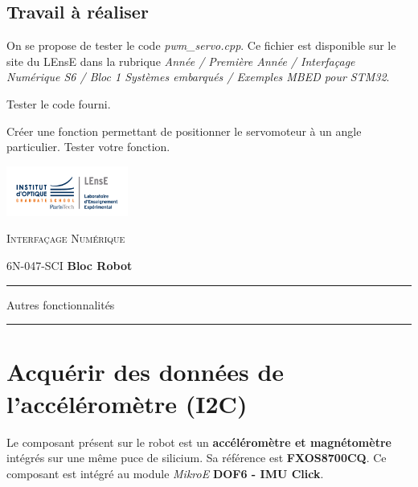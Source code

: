 \documentclass[a4paper,11pt,titlepage]{article} %
\begin{document}
\subsection{Travail à réaliser}

On se propose de tester le code \textsl{pwm\_servo.cpp}. Ce fichier est disponible sur le site du LEnsE dans la rubrique \textit{Année / Première Année / Interfaçage Numérique S6 / Bloc 1 Systèmes embarqués / Exemples MBED pour STM32}.

\Manip Tester le code fourni. 

\Manip Créer une fonction permettant de positionner le servomoteur à un angle particulier. Tester votre fonction. 



\newpage
\strut %
\begin{minipage}[c]{.25\linewidth}
	\includegraphics[width=4cm]{images/Logo-LEnsE.png}
\end{minipage} \hfill
\begin{minipage}[c]{.4\linewidth}

\begin{center}
\vspace{0.3cm}
{\Large \textsc{Interfaçage Numérique}}

\medskip

6N-047-SCI \qquad \textbf{\Large Bloc Robot}

\end{center}
\end{minipage}\hfill

\vspace{0.5cm}

\noindent \rule{\linewidth}{1pt}

{\noindent\Large \rule[-7pt]{0pt}{30pt} Autres fonctionnalités} 

\noindent \rule{\linewidth}{1pt}


\section{Acquérir des données de l'accéléromètre (I2C)}

Le composant présent sur le robot est un \textbf{accéléromètre et magnétomètre} intégrés sur une même puce de silicium. Sa référence est \textbf{FXOS8700CQ}. Ce composant est intégré au module \textit{MikroE} \textbf{DOF6 - IMU Click}.
\end{document}
